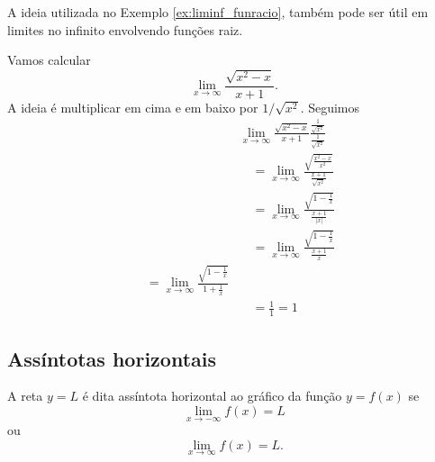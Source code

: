 A ideia utilizada no Exemplo \ref{ex:liminf_funracio}, também pode ser útil em limites no infinito envolvendo funções raiz.

\begin{ex}
  Vamos calcular
  \begin{equation}
    \lim_{x\to\infty}\frac{\sqrt{x^2-x}}{x+1}.
  \end{equation}
  A ideia é multiplicar em cima e em baixo por $1/\sqrt{x^2}$. Seguimos
  \begin{align}
    & \lim_{x\to\infty}\frac{\sqrt{x^2-x}}{x+1}\frac{\frac{1}{\sqrt{x^2}}}{\frac{1}{\sqrt{x^2}}} \\
    & \text{}\quad = \lim_{x\to\infty}\frac{\sqrt{\frac{x^2-x}{x^2}}}{\frac{x+1}{\sqrt{x^2}}} \\
    & \text{}\quad = \lim_{x\to\infty}\frac{\sqrt{1-\frac{1}{x}}}{\frac{x+1}{|x|}} \\
    & \text{}\quad = \lim_{x\to\infty}\frac{\sqrt{1-\frac{1}{x}}}{\frac{x+1}{x}} \\
    \text{}\quad = \lim_{x\to\infty}\frac{\sqrt{1-\frac{1}{x}}}{1+\frac{1}{x}} \\
    & \text{}\quad = \frac{1}{1} = 1
  \end{align}
\end{ex}

\subsection{Assíntotas horizontais}

A reta $y = L$ é dita assíntota horizontal ao gráfico da função $y = f(x)$ se
\begin{equation}
  \lim_{x\to -\infty} f(x) = L
\end{equation}
ou
\begin{equation}
  \lim_{x\to\infty} f(x) = L.
\end{equation}

